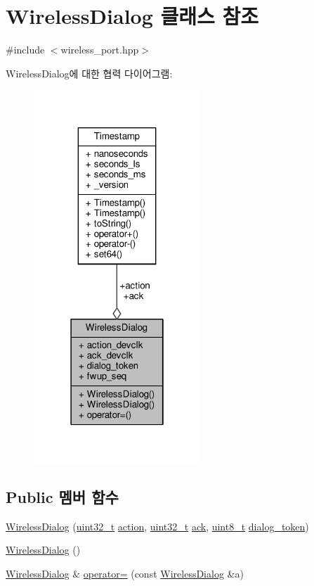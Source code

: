 \hypertarget{class_wireless_dialog}{}\section{Wireless\+Dialog 클래스 참조}
\label{class_wireless_dialog}


{\ttfamily \#include $<$wireless\+\_\+port.\+hpp$>$}



Wireless\+Dialog에 대한 협력 다이어그램\+:
\nopagebreak
\begin{figure}[H]
\begin{center}
\leavevmode
\includegraphics[width=178pt]{class_wireless_dialog__coll__graph}
\end{center}
\end{figure}
\subsection*{Public 멤버 함수}
\begin{DoxyCompactItemize}
\item 
\hyperlink{class_wireless_dialog_ae8ebf2f83e4c88857928d35aaff6c3f2}{Wireless\+Dialog} (\hyperlink{parse_8c_a6eb1e68cc391dd753bc8ce896dbb8315}{uint32\+\_\+t} \hyperlink{class_wireless_dialog_ad462f9a02358b1e73c51bca4328b8e21}{action}, \hyperlink{parse_8c_a6eb1e68cc391dd753bc8ce896dbb8315}{uint32\+\_\+t} \hyperlink{class_wireless_dialog_aba9c6cf90be4c737103f37ae82aa9cd0}{ack}, \hyperlink{stdint_8h_aba7bc1797add20fe3efdf37ced1182c5}{uint8\+\_\+t} \hyperlink{class_wireless_dialog_af4c116e249b109ded342c6ae740980ef}{dialog\+\_\+token})
\item 
\hyperlink{class_wireless_dialog_a2b0c0aa6be06ace3e6976703a6c35676}{Wireless\+Dialog} ()
\item 
\hyperlink{class_wireless_dialog}{Wireless\+Dialog} \& \hyperlink{class_wireless_dialog_a58bc65f82b963239c4ee4f518509ee19}{operator=} (const \hyperlink{class_wireless_dialog}{Wireless\+Dialog} \&a)
\end{DoxyCompactItemize}
